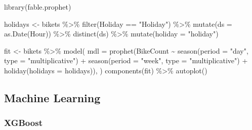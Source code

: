 \documentclass[
]{article}
\newenvironment{Shaded}{\begin{snugshade}}{\end{snugshade}}
\newcommand{\AttributeTok}[1]{\textcolor[rgb]{0.77,0.63,0.00}{#1}}
\newcommand{\FunctionTok}[1]{\textcolor[rgb]{0.00,0.00,0.00}{#1}}
\newcommand{\NormalTok}[1]{#1}
\newcommand{\OtherTok}[1]{\textcolor[rgb]{0.56,0.35,0.01}{#1}}
\newcommand{\SpecialCharTok}[1]{\textcolor[rgb]{0.00,0.00,0.00}{#1}}
\newcommand{\StringTok}[1]{\textcolor[rgb]{0.31,0.60,0.02}{#1}}
\begin{document}
\begin{Shaded}
\begin{Highlighting}[]
\FunctionTok{library}\NormalTok{(fable.prophet)}

\NormalTok{holidays }\OtherTok{\textless{}{-}}\NormalTok{ bikets }\SpecialCharTok{\%\textgreater{}\%} 
  \FunctionTok{filter}\NormalTok{(Holiday }\SpecialCharTok{==} \StringTok{"Holiday"}\NormalTok{) }\SpecialCharTok{\%\textgreater{}\%}
  \FunctionTok{mutate}\NormalTok{(}\AttributeTok{ds =} \FunctionTok{as.Date}\NormalTok{(Hour)) }\SpecialCharTok{\%\textgreater{}\%}
  \FunctionTok{distinct}\NormalTok{(ds) }\SpecialCharTok{\%\textgreater{}\%} 
  \FunctionTok{mutate}\NormalTok{(}\AttributeTok{holiday =} \StringTok{"holiday"}\NormalTok{)}

\NormalTok{fit }\OtherTok{\textless{}{-}}\NormalTok{ bikets }\SpecialCharTok{\%\textgreater{}\%}
  \FunctionTok{model}\NormalTok{(}
    \AttributeTok{mdl =} \FunctionTok{prophet}\NormalTok{(BikeCount }\SpecialCharTok{\textasciitilde{}} \FunctionTok{season}\NormalTok{(}\AttributeTok{period =} \StringTok{"day"}\NormalTok{, }\AttributeTok{type =} \StringTok{"multiplicative"}\NormalTok{) }\SpecialCharTok{+} \FunctionTok{season}\NormalTok{(}\AttributeTok{period =} \StringTok{"week"}\NormalTok{, }\AttributeTok{type =} \StringTok{"multiplicative"}\NormalTok{) }\SpecialCharTok{+} \FunctionTok{holiday}\NormalTok{(}\AttributeTok{holidays =}\NormalTok{ holidays)),}
\NormalTok{  )}
\FunctionTok{components}\NormalTok{(fit) }\SpecialCharTok{\%\textgreater{}\%} \FunctionTok{autoplot}\NormalTok{()}
\end{Highlighting}
\end{Shaded}

\hypertarget{machine-learning}{%
\subsection{Machine Learning}\label{machine-learning}}

\hypertarget{xgboost}{%
\subsubsection{XGBoost}\label{xgboost}}
\end{document}
